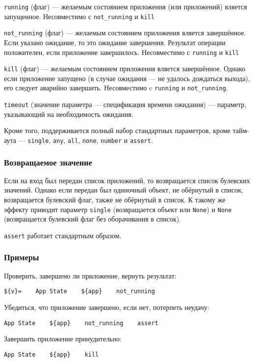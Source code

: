 \documentclass[11pt]{book} %
\begin{document}
\verb"running" (флаг) --- желаемым состоянием приложения (или приложений) вляется запущенное. Несовместимо с \verb"not_running" и \verb"kill"

\verb"not_running" (флаг) --- желаемым состоянием приложения вляется завершённое. Если указано ожидание, то это ожидание завершения. Результат операции положителен, если приложение завершилось. Несовместимо с \verb"running" и \verb"kill"

\verb"kill" (флаг) --- желаемым состоянием приложения вляется завершённое. Однако если приложение запущено (в случае ожидания --- не удалось дождаться выхода), его следует аварийно завершить. Несовместимо c \verb"running" и \verb"not_running".

\verb"timeout" (значение параметра --- спецификация времени ожидания) --- параметр, указывающий на необходимость ожидания.

Кроме того, поддерживается полный набор стандартных параметров, кроме тайм-аута --- \verb"single", \verb|any|, \verb|all|, \verb|none|, \verb|number| и \verb"assert". 


\subsubsection*{Возвращаемое значение}

Если на вход был передан список приложений, то возвращается список булевских значений. Однако если передан был одиночный объект, не обёрнутый в список, возвращается булевский флаг, также не обёрнутый в список. К такому же эффекту приводит параметр \verb|single| (возвращается объект или \verb|None|) и \verb|None| (возвращается булевский флаг без оборачивания в список).

\verb"assert" работает стандартным образом.

\subsubsection*{Примеры}

Проверить, завершено ли приложение, вернуть результат:
\begin{verbatim}${v}=    App State    ${app}    not_running\end{verbatim}

Убедиться, что приложение завершено, если нет, потерпеть неудачу:
\begin{verbatim}App State    ${app}    not_running    assert\end{verbatim}

Завершить приложение принудительно:
\begin{verbatim}App State    ${app}    kill\end{verbatim}
\end{document}
